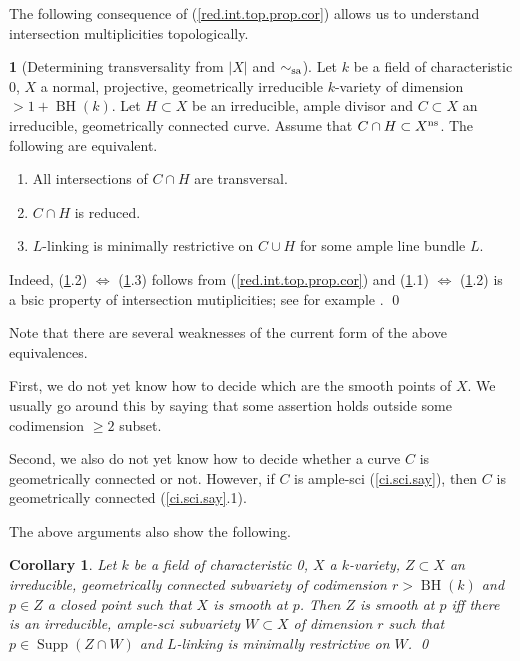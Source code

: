 \documentclass{amsart}
\newtheorem{cor}[thm]{Corollary}
\theoremstyle{definition}
\newtheorem{say}[thm]{}
\theoremstyle{remark}
\newcommand{\supp}[0]{\operatorname{Supp}}
\newcommand{\BH}[0]{\operatorname{BH}}
\newcommand{\simsa}[0]{\sim_{\rm sa}}
\begin{document}
The following consequence of (\ref{red.int.top.prop.cor})  allows us to understand  intersection multiplicities topologically.



\begin{say}[Determining transversality from $|X|$ and $\simsa$]
\label{num.eq.top.say.det}
 Let $k$ be a field of characteristic 0,
 $X$  a  normal, projective, geometrically irreducible  $k$-variety of dimension $>1+\BH(k)$.
Let $H\subset X$ be an irreducible, ample divisor and
$C\subset X$ an irreducible, geometrically connected   curve.
Assume that $C\cap H\subset X^{\rm ns}$.  The following are equivalent.
\begin{enumerate}
\item   All intersections of $C\cap H$ are transversal.
\item  $C\cap H$ is reduced.
\item  $L$-linking is minimally restrictive on  $C\cup H$ for some ample line bundle $L$.
\end{enumerate}
Indeed, (\ref{num.eq.top.say.det}.2) $\Leftrightarrow$  (\ref{num.eq.top.say.det}.3) follows from (\ref{red.int.top.prop.cor}) and
(\ref{num.eq.top.say.det}.1) $\Leftrightarrow$  (\ref{num.eq.top.say.det}.2)
is a bsic property of intersection mutiplicities; see for example \cite[8.2]{MR1644323}. \qed
\medskip

Note that there are several weaknesses of the current form of the above equivalences.


First, we do not yet know how to decide which are the  smooth  points of $X$.  We usually go around this by saying that some assertion holds outside some codimension $\geq 2$ subset.


Second, we also do not yet know how to decide whether a curve $C$ is
 geometrically  connected  or not. However, if $C$ is  ample-sci (\ref{ci.sci.say}),
then $C$ is geometrically  connected (\ref{ci.sci.say}.1).

\end{say}


The above arguments also show the following.

\begin{cor}\label{red.int.top.prop.cor.4}  
 Let $k$ be a field of characteristic 0,
 $X$  a $k$-variety, $Z\subset X$  an irreducible, geometrically connected  subvariety of codimension $r> \BH(k)$ and $p\in Z$ a closed point  such that $X$ is smooth at $p$. 
Then $Z$ is smooth at $p$ iff there is an irreducible, ample-sci subvariety $W\subset X$  of dimension $r$
such that $p\in \supp(Z\cap W)$ and 
$L$-linking is minimally restrictive on  $W$. \qed
\end{cor}
\end{document}
